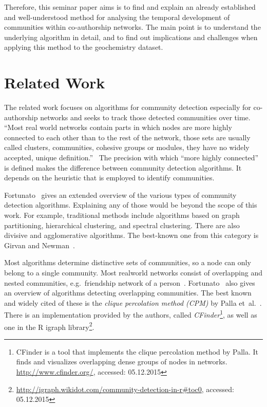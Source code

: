 \documentclass[runningheads,a4paper]{llncs}
\begin{document}
Therefore, this seminar paper aims is to find and explain an already established and well-understood method for analysing the temporal development of communities within co-authorship networks. The main point is to understand the underlying algorithm in detail, and to find out implications and challenges when applying this method to the geochemistry dataset.

\section{Related Work}
\label{related}
The related work focuses on algorithms for community detection especially for co-authorship networks and seeks to track those detected communities over time.
``Most real world networks contain parts in which nodes are more highly connected to each other than to the rest of the network, those sets are usually called clusters, communities, cohesive groups or modules, they have no widely accepted, unique definition.''~\cite{palla2005uncovering}
The precision with which ``more highly connected'' is defined makes the difference between community detection algorithms.
It depends on the heuristic that is employed to identify communities.~\cite{porter2009communities}

Fortunato~\cite{fortunato2010community} gives an extended overview of the various types of community detection algorithms.
Explaining any of those would be beyond the scope of this work.
For example, traditional methods include algorithms based on graph partitioning, hierarchical clustering, and spectral clustering.
There are also divisive and agglomerative algorithms.
The best-known one from this category is Girvan and Newman~\cite{girvan2002community}.

Most algorithms determine distinctive sets of communities, so a node can only belong to a single community. Most realworld networks consist of overlapping and nested communities, e.g.~friendship network of a person~\cite{palla2005uncovering}.
Fortunato~\cite{fortunato2010community} also gives an overview of algorithms detecting overlapping communities.
The best known and widely cited of these is the \emph{clique percolation method (CPM)} by Palla et~al.~\cite{palla2005uncovering}.
There is an implementation provided by the authors, called \emph{CFinder}\footnote{CFinder is a tool that implements the clique percolation method by Palla. It finds and visualizes overlapping dense groups of nodes in networks. \url{http://www.cfinder.org/}, accessed: 05.12.2015}, as well as one in the R igraph library\footnote{\url{http://igraph.wikidot.com/community-detection-in-r#toc0}, accessed: 05.12.2015}.
\end{document}
